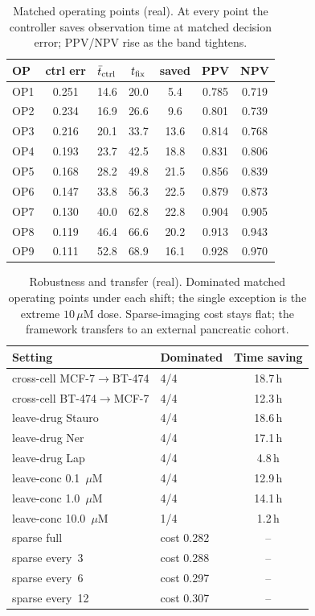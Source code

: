 \begin{table}[t]\centering\small\caption{Matched operating points (real). At every point the controller saves observation time at matched decision error; PPV/NPV rise as the band tightens.}\label{tab:matched}
\begin{tabular}{@{}lcccccc@{}}\toprule
OP & ctrl err & $\bar t_{\rm ctrl}$ & $t_{\rm fix}$ & saved & PPV & NPV\\\midrule
OP1 & 0.251 & 14.6 & 20.0 & 5.4 & 0.785 & 0.719\\
OP2 & 0.234 & 16.9 & 26.6 & 9.6 & 0.801 & 0.739\\
OP3 & 0.216 & 20.1 & 33.7 & 13.6 & 0.814 & 0.768\\
OP4 & 0.193 & 23.7 & 42.5 & 18.8 & 0.831 & 0.806\\
OP5 & 0.168 & 28.2 & 49.8 & 21.5 & 0.856 & 0.839\\
OP6 & 0.147 & 33.8 & 56.3 & 22.5 & 0.879 & 0.873\\
OP7 & 0.130 & 40.0 & 62.8 & 22.8 & 0.904 & 0.905\\
OP8 & 0.119 & 46.4 & 66.6 & 20.2 & 0.913 & 0.943\\
OP9 & 0.111 & 52.8 & 68.9 & 16.1 & 0.928 & 0.970\\
\bottomrule\end{tabular}\end{table}

\begin{table}[t]\centering\small\caption{Robustness and transfer (real). Dominated matched operating points under each shift; the single exception is the extreme $10\,\mu$M dose. Sparse-imaging cost stays flat; the framework transfers to an external pancreatic cohort.}\label{tab:robust}
\begin{tabular}{@{}llc@{}}\toprule
Setting & Dominated & Time saving\\\midrule
cross-cell MCF-7$\to$BT-474 & 4/4 & 18.7\,h\\
cross-cell BT-474$\to$MCF-7 & 4/4 & 12.3\,h\\
leave-drug Stauro & 4/4 & 18.6\,h\\
leave-drug Ner & 4/4 & 17.1\,h\\
leave-drug Lap & 4/4 & 4.8\,h\\
leave-conc 0.1~$\mu$M & 4/4 & 12.9\,h\\
leave-conc 1.0~$\mu$M & 4/4 & 14.1\,h\\
leave-conc 10.0~$\mu$M & 1/4 & 1.2\,h\\
sparse full & cost 0.282 & --\\
sparse every~3 & cost 0.288 & --\\
sparse every~6 & cost 0.297 & --\\
sparse every~12 & cost 0.307 & --\\
\bottomrule\end{tabular}\end{table}
